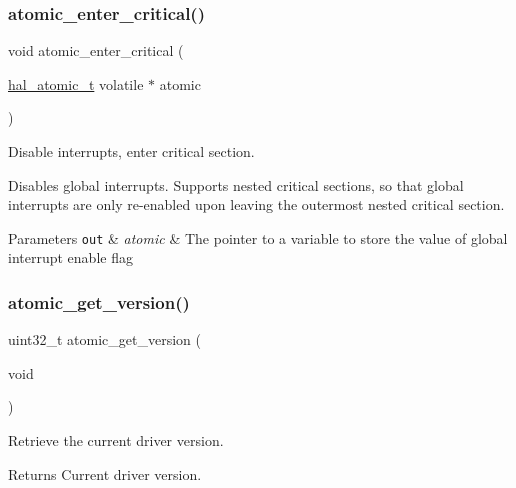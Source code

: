\subsubsection{\texorpdfstring{atomic\+\_\+enter\+\_\+critical()}{atomic\_enter\_critical()}}
{\footnotesize\ttfamily void atomic\+\_\+enter\+\_\+critical (\begin{DoxyParamCaption}\item[{\hyperlink{group__doc__driver__hal__helper__atomic_ga6b3a0c9eea25111ac1877e0302e2fe1c}{hal\+\_\+atomic\+\_\+t} volatile $\ast$}]{atomic }\end{DoxyParamCaption})}



Disable interrupts, enter critical section. 

Disables global interrupts. Supports nested critical sections, so that global interrupts are only re-\/enabled upon leaving the outermost nested critical section.


\begin{DoxyParams}[1]{Parameters}
\mbox{\tt out}  & {\em atomic} & The pointer to a variable to store the value of global interrupt enable flag \\
\hline
\end{DoxyParams}
\mbox{\label{group__doc__driver__hal__helper__atomic_ga75fe13100e2799eb24a80123bc8c3787}} 
\subsubsection{\texorpdfstring{atomic\+\_\+get\+\_\+version()}{atomic\_get\_version()}}
{\footnotesize\ttfamily uint32\+\_\+t atomic\+\_\+get\+\_\+version (\begin{DoxyParamCaption}\item[{void}]{ }\end{DoxyParamCaption})}



Retrieve the current driver version. 

\begin{DoxyReturn}{Returns}
Current driver version. 
\end{DoxyReturn}
\mbox{\label{group__doc__driver__hal__helper__atomic_gaef0ccaa2438aca5ea074b36252d65990}} 
